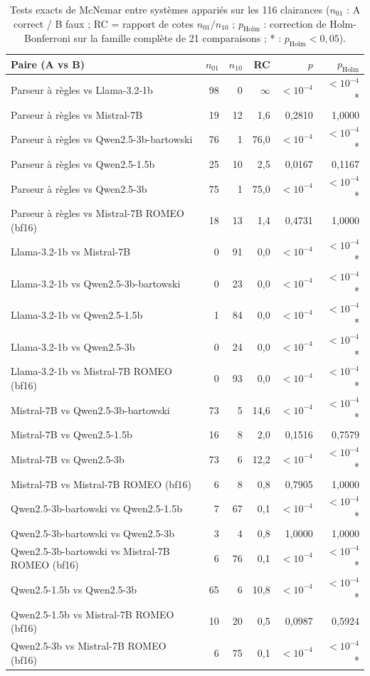 \begin{table}[t]\centering\small
\caption{Tests exacts de McNemar entre systèmes appariés sur les 116 clairances ($n_{01}$ : A correct / B faux ; RC = rapport de cotes $n_{01}/n_{10}$ ; $p_{\mathrm{Holm}}$ : correction de Holm-Bonferroni sur la famille complète de 21 comparaisons ; * : $p_{\mathrm{Holm}}<0{,}05$).}
\label{tab:mcnemar}
\begin{tabular}{lrrrrr}
\toprule
Paire (A vs B) & $n_{01}$ & $n_{10}$ & RC & $p$ & $p_{\mathrm{Holm}}$ \\
\midrule
Parseur à règles vs Llama-3.2-1b & 98 & 0 & $\infty$ & $<10^{-4}$ & $<10^{-4}$* \\
Parseur à règles vs Mistral-7B & 19 & 12 & 1,6 & 0,2810 & 1,0000\phantom{*} \\
Parseur à règles vs Qwen2.5-3b-bartowski & 76 & 1 & 76,0 & $<10^{-4}$ & $<10^{-4}$* \\
Parseur à règles vs Qwen2.5-1.5b & 25 & 10 & 2,5 & 0,0167 & 0,1167\phantom{*} \\
Parseur à règles vs Qwen2.5-3b & 75 & 1 & 75,0 & $<10^{-4}$ & $<10^{-4}$* \\
Parseur à règles vs Mistral-7B ROMEO (bf16) & 18 & 13 & 1,4 & 0,4731 & 1,0000\phantom{*} \\
Llama-3.2-1b vs Mistral-7B & 0 & 91 & 0,0 & $<10^{-4}$ & $<10^{-4}$* \\
Llama-3.2-1b vs Qwen2.5-3b-bartowski & 0 & 23 & 0,0 & $<10^{-4}$ & $<10^{-4}$* \\
Llama-3.2-1b vs Qwen2.5-1.5b & 1 & 84 & 0,0 & $<10^{-4}$ & $<10^{-4}$* \\
Llama-3.2-1b vs Qwen2.5-3b & 0 & 24 & 0,0 & $<10^{-4}$ & $<10^{-4}$* \\
Llama-3.2-1b vs Mistral-7B ROMEO (bf16) & 0 & 93 & 0,0 & $<10^{-4}$ & $<10^{-4}$* \\
Mistral-7B vs Qwen2.5-3b-bartowski & 73 & 5 & 14,6 & $<10^{-4}$ & $<10^{-4}$* \\
Mistral-7B vs Qwen2.5-1.5b & 16 & 8 & 2,0 & 0,1516 & 0,7579\phantom{*} \\
Mistral-7B vs Qwen2.5-3b & 73 & 6 & 12,2 & $<10^{-4}$ & $<10^{-4}$* \\
Mistral-7B vs Mistral-7B ROMEO (bf16) & 6 & 8 & 0,8 & 0,7905 & 1,0000\phantom{*} \\
Qwen2.5-3b-bartowski vs Qwen2.5-1.5b & 7 & 67 & 0,1 & $<10^{-4}$ & $<10^{-4}$* \\
Qwen2.5-3b-bartowski vs Qwen2.5-3b & 3 & 4 & 0,8 & 1,0000 & 1,0000\phantom{*} \\
Qwen2.5-3b-bartowski vs Mistral-7B ROMEO (bf16) & 6 & 76 & 0,1 & $<10^{-4}$ & $<10^{-4}$* \\
Qwen2.5-1.5b vs Qwen2.5-3b & 65 & 6 & 10,8 & $<10^{-4}$ & $<10^{-4}$* \\
Qwen2.5-1.5b vs Mistral-7B ROMEO (bf16) & 10 & 20 & 0,5 & 0,0987 & 0,5924\phantom{*} \\
Qwen2.5-3b vs Mistral-7B ROMEO (bf16) & 6 & 75 & 0,1 & $<10^{-4}$ & $<10^{-4}$* \\
\bottomrule
\end{tabular}
\end{table}
